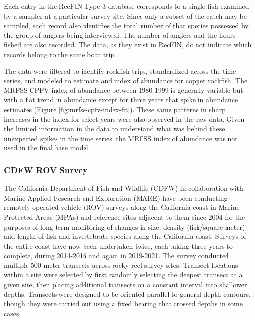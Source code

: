 \documentclass[11pt,
  english,
  letterpaper,
]{article}
\begin{document}
Each entry in the RecFIN Type 3 database corresponds to a single fish examined by a sampler at a particular survey site. Since only a subset of the catch may be sampled, each record also identifies the total number of that species possessed by the group of anglers being interviewed. The number of anglers and the hours fished are also recorded. The data, as they exist in RecFIN, do not indicate which records belong to the same boat trip.

The data were filtered to identify rockfish trips, standardized across the time series, and modeled to estimate and index of abundance for copper rockfish. The MRFSS CPFV index of abundance between 1980-1999 is generally variable but with a flat trend in abundance except for three years that spike in abundance estimates (Figure \ref{fig:mrfss-cpfv-index-fit}). These same patterns in sharp increases in the index for select years were also observed in the raw data. Given the limited information in the data to understand what was behind these unexpected spikes in the time series, the MRFSS index of abundance was not used in the final base model.

\hypertarget{cdfw-rov-not-included}{%
\subsubsection{CDFW ROV Survey}\label{cdfw-rov-not-included}}

The California Department of Fish and Wildlife (CDFW) in collaboration with Marine Applied Research and Exploration (MARE) have been conducting remotely operated vehicle (ROV) surveys along the California coast in Marine Protected Areas (MPAs) and reference sites adjacent to them since 2004 for the purposes of long-term monitoring of changes in size, density (fish/square meter) and length of fish and invertebrate species along the California coast. Surveys of the entire coast have now been undertaken twice, each taking three years to complete, during 2014-2016 and again in 2019-2021. The survey conducted multiple 500 meter transects across rocky reef survey sites. Transect locations within a site were selected by first randomly selecting the deepest transect at a given site, then placing additional transects on a constant interval into shallower depths. Transects were designed to be oriented parallel to general depth contours, though they were carried out using a fixed bearing that crossed depths in some cases.
\end{document}
